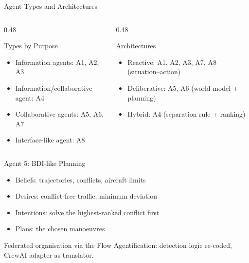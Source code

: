

\begin{frame}{Agent Types and Architectures}

\small

\begin{columns}[T]

\begin{column}{0.48\textwidth}

\begin{block}{Types by Purpose}
\begin{itemize}
    \item Information agents:
    A1, A2, A3

    \item Information/collaborative agent:
    A4

    \item Collaborative agents:
    A5, A6, A7

    \item Interface-like agent:
    A8
\end{itemize}
\end{block}

\end{column}

\begin{column}{0.48\textwidth}

\begin{block}{Architectures}
\begin{itemize}
    \item Reactive:
    A1, A2, A3, A7, A8 (situation--action)

    \item Deliberative:
    A5, A6 (world model + planning)

    \item Hybrid:
    A4 (separation rule + ranking)
\end{itemize}
\end{block}

\end{column}

\end{columns}

\vspace{0.05cm}

\begin{block}{Agent 5: BDI-like Planning}
\begin{itemize}\setlength{\itemsep}{0pt}
    \item Beliefs: trajectories, conflicts, aircraft limits
    \item Desires: conflict-free traffic, minimum deviation
    \item Intentions: solve the highest-ranked conflict first
    \item Plans: the chosen manoeuvres
\end{itemize}
\end{block}

\centering
\scriptsize
Federated organisation via the Flow \textperiodcentered{} Agentification: detection logic re-coded, CrewAI adapter as translator.

\end{frame}
